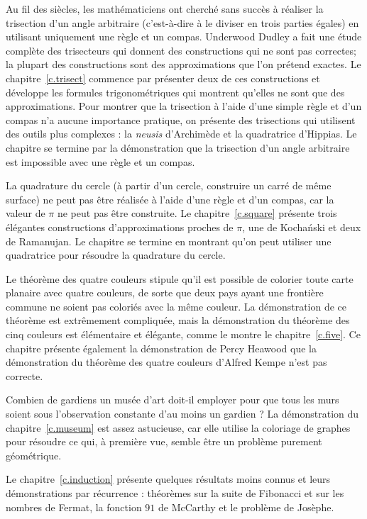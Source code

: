 Au fil des siècles, les mathématiciens ont cherché sans succès à réaliser la trisection d'un angle arbitraire (c'est-à-dire à le diviser en trois parties égales) en utilisant uniquement une règle et un compas. Underwood Dudley a fait une étude complète des \og trisecteurs\fg{} qui donnent des constructions qui ne sont pas correctes; la plupart des constructions sont des approximations que l'on prétend exactes. Le chapitre~\ref{c.trisect} commence par présenter deux de ces constructions et développe les formules trigonométriques qui montrent qu'elles ne sont que des approximations. Pour montrer que la trisection à l'aide d'une simple règle et d'un compas n'a aucune importance pratique, on présente des trisections qui utilisent des outils plus complexes : la \emph{neusis} d'Archimède et la quadratrice d'Hippias. Le chapitre se termine par la démonstration  que la trisection  d'un angle arbitraire est impossible  
 avec une règle et un compas. 

La quadrature du cercle (à partir d'un cercle, construire un carré de même surface) ne peut pas être réalisée à l'aide d'une règle et d'un compas, car la valeur de $\pi$ ne peut pas être construite. Le chapitre~\ref{c.square} présente trois élégantes constructions d'approximations proches de $\pi$, une de Kocha\'{n}ski et deux de Ramanujan. Le chapitre se termine en montrant qu'on peut utiliser une quadratrice  pour résoudre la quadrature du  cercle.

Le théorème des quatre couleurs stipule qu'il est possible de colorier toute carte planaire avec quatre couleurs, de sorte que deux pays ayant une frontière commune ne soient pas coloriés avec la même couleur. La démonstration de ce théorème est extrêmement compliquée, mais la démonstration du théorème des cinq couleurs est élémentaire et élégante, comme le montre le chapitre~\ref{c.five}. Ce chapitre présente également la démonstration de Percy Heawood que la \og démonstration\fg{} du théorème des quatre couleurs d'Alfred Kempe n'est pas correcte.

Combien de gardiens 
 un musée d'art doit-il employer   pour que tous les murs soient sous l'observation constante d'au moins un gardien ? La démonstration du chapitre~\ref{c.museum} est assez astucieuse, car elle utilise la coloriage de graphes pour résoudre ce qui, à première vue, semble être un problème purement géométrique.

Le chapitre~\ref{c.induction} présente quelques résultats moins connus et leurs démonstrations  par récurrence : théorèmes sur la suite de Fibonacci et sur les nombres de Fermat, la fonction $91$ de McCarthy et le problème de Josèphe.

